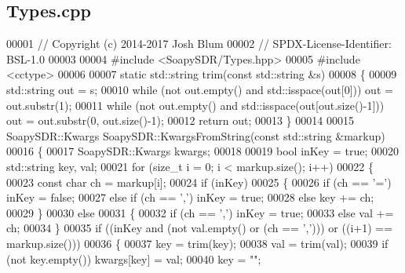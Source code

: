 \subsection{Types.\+cpp}
\label{Types_8cpp_source}

\begin{DoxyCode}
00001 \textcolor{comment}{// Copyright (c) 2014-2017 Josh Blum}
00002 \textcolor{comment}{// SPDX-License-Identifier: BSL-1.0}
00003 
00004 \textcolor{preprocessor}{#include <SoapySDR/Types.hpp>}
00005 \textcolor{preprocessor}{#include <cctype>}
00006 
00007 \textcolor{keyword}{static} std::string trim(\textcolor{keyword}{const} std::string &s)
00008 \{
00009     std::string out = s;
00010     \textcolor{keywordflow}{while} (not out.empty() and std::isspace(out[0])) out = out.substr(1);
00011     \textcolor{keywordflow}{while} (not out.empty() and std::isspace(out[out.size()-1])) out = out.substr(0, out.size()-1);
00012     \textcolor{keywordflow}{return} out;
00013 \}
00014 
00015 SoapySDR::Kwargs SoapySDR::KwargsFromString(\textcolor{keyword}{const} std::string &markup)
00016 \{
00017     SoapySDR::Kwargs kwargs;
00018 
00019     \textcolor{keywordtype}{bool} inKey = \textcolor{keyword}{true};
00020     std::string key, val;
00021     \textcolor{keywordflow}{for} (\textcolor{keywordtype}{size\_t} i = 0; i < markup.size(); i++)
00022     \{
00023         \textcolor{keyword}{const} \textcolor{keywordtype}{char} ch = markup[i];
00024         \textcolor{keywordflow}{if} (inKey)
00025         \{
00026             \textcolor{keywordflow}{if} (ch == \textcolor{charliteral}{'='}) inKey = \textcolor{keyword}{false};
00027             \textcolor{keywordflow}{else} \textcolor{keywordflow}{if} (ch == \textcolor{charliteral}{','}) inKey = \textcolor{keyword}{true};
00028             \textcolor{keywordflow}{else} key += ch;
00029         \}
00030         \textcolor{keywordflow}{else}
00031         \{
00032             \textcolor{keywordflow}{if} (ch == \textcolor{charliteral}{','}) inKey = \textcolor{keyword}{true};
00033             \textcolor{keywordflow}{else} val += ch;
00034         \}
00035         \textcolor{keywordflow}{if} ((inKey and (not val.empty() or (ch == \textcolor{charliteral}{','}))) or ((i+1) == markup.size()))
00036         \{
00037             key = trim(key);
00038             val = trim(val);
00039             \textcolor{keywordflow}{if} (not key.empty()) kwargs[key] = val;
00040             key = \textcolor{stringliteral}{""};

\end{DoxyCode}
